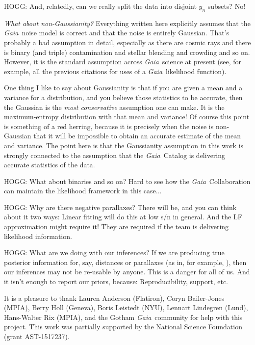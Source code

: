 \documentclass[12pt, modern]{aastex62}
\newcommand{\acronym}[1]{{\small{#1}}}
\newcommand{\Gaia}{\textsl{Gaia}}
\begin{document}
HOGG: And, relatedly, can we really split the data into disjoint $y_n$ subsets?
No!

\emph{What about non-Gaussianity?} Everything written here
 explicitly assumes that the \Gaia\ noise
model is correct and that the noise is entirely Gaussian.
That's probably a bad assumption in detail,
especially as there are cosmic rays and there is binary (and triple)
contamination and stellar blending and crowding and so on.
However, it is the standard assumption across \Gaia\ science at
present (see, for example, all the previous citations for uses of a
\Gaia\ likelihood function).

One thing I like to say about Gaussianity is that if you are given a mean
and a variance for a distribution, and you believe those statistics to be
accurate, then the Gaussian is the \emph{most conservative} assumption one
can make.
It is the maximum-entropy distribution with that mean and variance!
Of course this point is something of a red herring, because it is precisely
when the noise is non-Gaussian that it will be impossible to obtain an
accurate estimate of the mean and variance.
The point here is that the Gaussianity assumption in this work is strongly connected
to the assumption that the \Gaia\ Catalog is delivering accurate statistics of
the data.

HOGG: What about binaries and so on? Hard to see how the \Gaia\ Collaboration can
maintain the likelihood framework in this case...

HOGG: Why are there negative parallaxes? There will be, and you can think about
it two ways: Linear fitting will do this at low s/n in general. And the
LF approximation might require it!
They are required if the team is delivering likelihood information.

HOGG: What are we doing with our inferences? If we are producing true posterior
information for, say, distances or parallaxes (as in, for example,
\citealt{tri3, leistedt, anderson}), then our inferences may not
be re-usable by anyone. This is a danger for all of us. And it isn't enough
to report our priors, because: Reproducibility, support, etc.

\acknowledgements
It is a pleasure to thank
  Lauren Anderson (Flatiron),
  Coryn Bailer-Jones (MPIA),
  Berry Holl (Geneva),
  Boris Leistedt (NYU),
  Lennart Lindegren (Lund),
  Hans-Walter Rix (MPIA),
and the Gotham \Gaia\ community for help with this project.
This work was partially supported by
  the National Science Foundation (grant \acronym{AST-1517237}).


\end{document}
